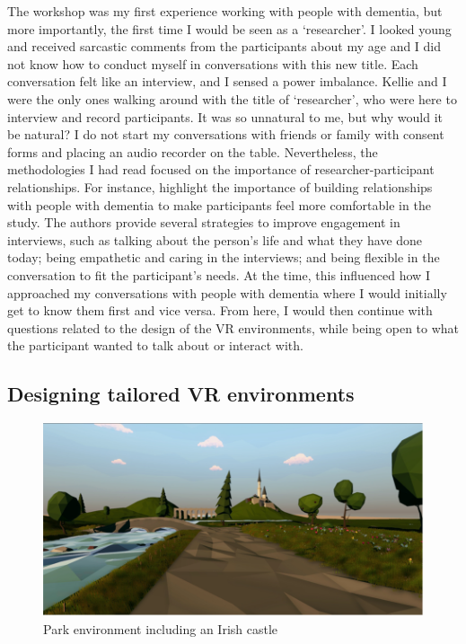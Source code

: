 The workshop was my first experience working with people with dementia, but more importantly, the first time I would be seen as a `researcher'. I looked young and received sarcastic comments from the participants about my age and I did not know how to conduct myself in conversations with this new title. Each conversation felt like an interview, and I sensed a power imbalance. Kellie and I were the only ones walking around with the title of `researcher', who were here to interview and record participants. It was so unnatural to me, but why would it be natural? I do not start my conversations with friends or family with consent forms and placing an audio recorder on the table. Nevertheless, the methodologies I had read focused on the importance of researcher-participant relationships. For instance, \cite{mckillop2004make} highlight the importance of building relationships with people with dementia to make participants feel more comfortable in the study. The authors provide several strategies to improve engagement in interviews, such as talking about the person's life and what they have done today; being empathetic and caring in the interviews; and being flexible in the conversation to fit the participant's needs. At the time, this influenced how I approached my conversations with people with dementia where I would initially get to know them first and vice versa. From here, I would then continue with questions related to the design of the VR environments, while being open to what the participant wanted to talk about or interact with.

\subsection{Designing tailored VR environments}
\label{S1:VREnvrionments}

\begin{figure}
\centering
\includegraphics[width=.8\linewidth]{Images/ChapterFour/IrishCastlVR.png}
\caption{Park environment including an Irish castle}
\label{fig:IrishCastle}
\end{figure}

